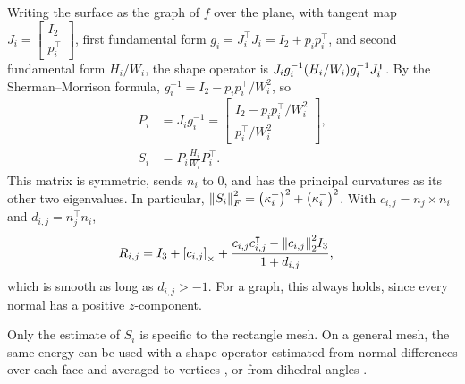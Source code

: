 Writing the surface as the graph of \(f\) over the plane, with tangent map \(J_i = \begin{bmatrix} I_2 \\ p_i^\intercal \end{bmatrix}\), first fundamental form \(g_i = J_i^\intercal J_i = I_2 + p_i p_i^\intercal\), and second fundamental form \(H_i / W_i\), the shape operator is \(J_i g_i^{-1} \pof{H_i / W_i} g_i^{-1} J_i^\intercal\). By the Sherman--Morrison formula, \(g_i^{-1} = I_2 - p_i p_i^\intercal / W_i^2\), so \begin{align*}
	P_i &= J_i g_i^{-1} = \begin{bmatrix} I_2 - p_i p_i^\intercal / W_i^2 \\ p_i^\intercal / W_i^2 \end{bmatrix}, \\
	S_i &= P_i \frac{H_i}{W_i} P_i^\intercal.
\end{align*}
This matrix is symmetric, sends \(n_i\) to \(0\), and has the principal curvatures as its other two eigenvalues. In particular, \(\norm{S_i}_F^2 = \pof{\kappa^+_i}^2 + \pof{\kappa^-_i}^2\). With \(c_{i, j} = n_j \times n_i\) and \(d_{i, j} = n_j^\intercal n_i\), \begin{align*}
	R_{i, j} &= I_3 + \sof{c_{i, j}}_\times + \frac{c_{i, j} c_{i, j}^\intercal - \norm{c_{i, j}}_2^2 I_3}{1 + d_{i, j}},
\end{align*}
which is smooth as long as \(d_{i, j} > -1\). For a graph, this always holds, since every normal has a positive \(z\)-component.

Only the estimate of \(S_i\) is specific to the rectangle mesh. On a general mesh, the same energy can be used with a shape operator estimated from normal differences over each face and averaged to vertices \cite{Rusinkiewicz2004Curvatures}, or from dihedral angles \cite{Grinspun2006ShapeOperators}.

